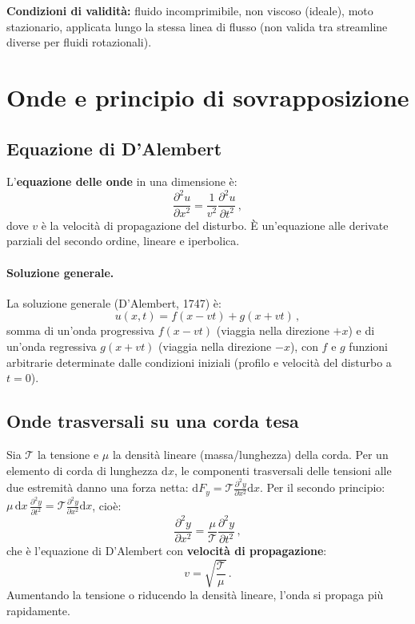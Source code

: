 \documentclass[11pt,a4paper]{article}
\theoremstyle{plain}
\theoremstyle{definition}
\theoremstyle{remark}
\begin{document}
\textbf{Condizioni di validità:}
fluido incomprimibile, non viscoso (ideale), moto stazionario, applicata
lungo la stessa linea di flusso (non valida tra streamline diverse per fluidi
rotazionali).

\section{Onde e principio di sovrapposizione}

\subsection{Equazione di D'Alembert}

L'\textbf{equazione delle onde} in una dimensione è:
\[
  \frac{\partial^2 u}{\partial x^2}=\frac{1}{v^2}\frac{\partial^2 u}{\partial t^2}\,,
\]
dove $v$ è la velocità di propagazione del disturbo. È un'equazione alle
derivate parziali del secondo ordine, lineare e iperbolica.

\paragraph{Soluzione generale.}
La soluzione generale (D'Alembert, 1747) è:
\[
  u(x,t)=f(x-vt)+g(x+vt)\,,
\]
somma di un'onda progressiva $f(x-vt)$ (viaggia nella direzione $+x$) e di
un'onda regressiva $g(x+vt)$ (viaggia nella direzione $-x$), con $f$ e $g$
funzioni arbitrarie determinate dalle condizioni iniziali (profilo e velocità
del disturbo a $t=0$).

\subsection{Onde trasversali su una corda tesa}

Sia $\mathcal{T}$ la tensione e $\mu$ la densità lineare (massa/lunghezza)
della corda. Per un elemento di corda di lunghezza $\mathrm{d}x$, le
componenti trasversali delle tensioni alle due estremità danno una forza netta:
$\mathrm{d}F_y=\mathcal{T}\frac{\partial^2 y}{\partial x^2}\mathrm{d}x$.
Per il secondo principio: $\mu\,\mathrm{d}x\,\frac{\partial^2 y}{\partial t^2}=\mathcal{T}\frac{\partial^2 y}{\partial x^2}\mathrm{d}x$, cioè:
\[
  \frac{\partial^2 y}{\partial x^2}=\frac{\mu}{\mathcal{T}}\frac{\partial^2 y}{\partial t^2}\,,
\]
che è l'equazione di D'Alembert con \textbf{velocità di propagazione}:
\[
  v=\sqrt{\frac{\mathcal{T}}{\mu}}\,.
\]
Aumentando la tensione o riducendo la densità lineare, l'onda si propaga più
rapidamente.
\end{document}
